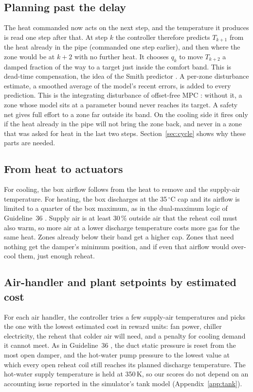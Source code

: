\documentclass{article}
\begin{document}
\subsection{Planning past the delay}\label{sec:plan}
The heat commanded now acts on the next step, and the temperature it produces is read one step after that. At step
$k$ the controller therefore predicts $T_{k+1}$ from the heat already in the pipe (commanded one step earlier), and
then where the zone would be at $k+2$ with no further heat. It chooses $q_k$ to move $T_{k+2}$ a damped fraction of
the way to a target just inside the comfort band. This is dead-time compensation, the idea of the Smith predictor
\cite{smith1957deadtime}. A per-zone disturbance estimate, a smoothed average of the model's recent errors, is added
to every prediction. This is the integrating disturbance of offset-free MPC
\cite{muske2002disturbance,pannocchia2003disturbance}: without it, a zone whose model sits at a parameter bound never
reaches its target. A safety net gives full effort to a zone far outside its band. On the cooling side it fires
only if the heat already in the pipe will not bring the zone back, and never in a zone that was asked for heat in the
last two steps. Section~\ref{sec:cycle} shows why these parts are needed.

\subsection{From heat to actuators}
For cooling, the box airflow follows from the heat to remove and the supply-air temperature. For heating, the box
discharges at the 35\,$^\circ$C cap and its airflow is limited to a quarter of the box maximum, as in the dual-maximum
logic of Guideline~36 \cite{ashrae2021g36}. Supply air is at least 30\,\% outside air that the reheat
coil must also warm, so more air at a lower discharge temperature costs more gas for the same heat. Zones already
below their band get a higher cap. Zones that need nothing
get the damper's minimum position, and if even that airflow would over-cool them, just enough reheat.

\subsection{Air-handler and plant setpoints by estimated cost}
For each air handler, the controller tries a few supply-air temperatures and picks the one with the lowest estimated
cost in reward units: fan power, chiller electricity, the reheat that colder air will need, and a penalty for cooling
demand it cannot meet. As in Guideline~36
\cite{ashrae2021g36}, the duct static pressure is reset from the most open damper, and the hot-water pump pressure to the
lowest value at which every open reheat coil still reaches its planned discharge temperature. The hot-water supply temperature is held at 350\,K, so our scores do
not depend on an accounting issue reported in the simulator's tank model (Appendix~\ref{app:tank}).
\end{document}

